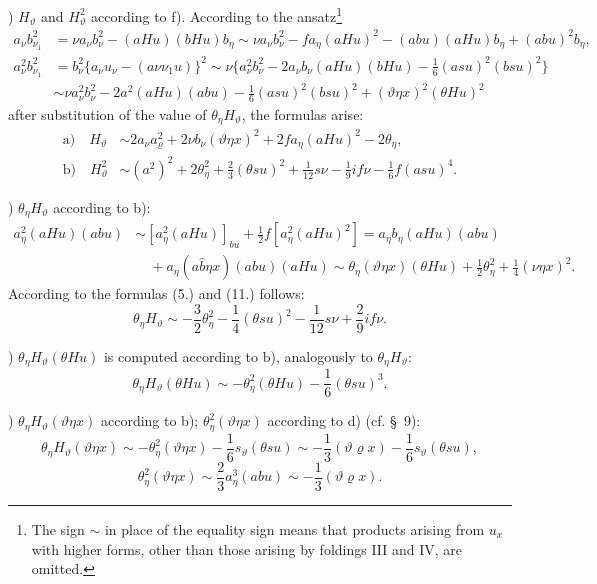 \documentclass[11pt]{article}
\newcommand{\R}{\varrho}
\begin{document}
) $H_\vartheta$ and $H_\vartheta^2$ according to f). According to the ansatz\footnote{The sign $\sim$ in place of the equality sign means that products arising from $u_x$ with higher forms, other than those arising by foldings III and IV, are omitted.}
\[
\begin{aligned}
a_\nu b_{\nu_1}^2
&=\nu a_\nu b_\nu^2-(aHu)(bHu)b_\eta
\sim \nu a_\nu b_\nu^2-f a_\eta(aHu)^2-(abu)(aHu)b_\eta+(abu)^2b_\eta,\\
a_\nu^2b_{\nu_1}^2
&=b_\nu^2\{a_\nu u_\nu-(a\nu\nu_1u)\}^2
\sim \nu\{a_\nu^2b_\nu^2-2a_\nu b_\nu(aHu)(bHu)
-\frac16(asu)^2(bsu)^2\}\\
&\sim \nu a_\nu^2b_\nu^2-2a^2(aHu)(abu)-\frac16(asu)^2(bsu)^2+(\vartheta\eta x)^2(\theta Hu)^2
\end{aligned}
\]
after substitution of the value of $\theta_\eta H_\vartheta$, the formulas arise:
\[
\tag{12}
\begin{aligned}
\text{a)}\quad H_\vartheta&\sim 2a_\nu a_\R^2+2\nu b_\nu(\vartheta\eta x)^2+2f a_\eta(aHu)^2-2\theta_\eta,\\
\text{b)}\quad H_\vartheta^2&\sim (a^2)^2+2\theta_\eta^2+\frac23(\theta su)^2
+\frac1{12}s\nu-\frac19if\nu-\frac16f(asu)^4.
\end{aligned}
\]

) $\theta_\eta H_\vartheta$ according to b):
\[
\begin{aligned}
a_\eta^2(aHu)(abu)&\sim [a_\eta^2(aHu)]_{bu}+\frac12 f[a_\eta^2(aHu)^2]
=a_\eta b_\eta(aHu)(abu)\\
&\quad+a_\eta(a\widehat{b}\eta x)(abu)(aHu)
\sim \theta_\eta(\vartheta\eta x)(\theta Hu)+\frac12\theta_\eta^2+\frac14(\nu\eta x)^2.
\end{aligned}
\]
According to the formulas (5.) and (11.) follows:
\[
\theta_\eta H_\vartheta\sim -\frac32\theta_\eta^2-\frac14(\theta su)^2-\frac1{12}s\nu+\frac29if\nu.
\]

) $\theta_\eta H_\vartheta(\theta Hu)$ is computed according to b), analogously to $\theta_\eta H_\vartheta$:
\[
\theta_\eta H_\vartheta(\theta Hu)\sim-\theta_\eta^2(\theta Hu)-\frac16(\theta su)^3.
\]

) $\theta_\eta H_\vartheta(\vartheta\eta x)$ according to b); $\theta_\eta^2(\vartheta\eta x)$ according to d) (cf. \S\ 9):
\[
\theta_\eta H_\vartheta(\vartheta\eta x)\sim-\theta_\eta^2(\vartheta\eta x)-\frac16s_\vartheta(\theta su)
\sim-\frac13(\vartheta\R x)-\frac16s_\vartheta(\theta su),
\]
\[
\theta_\eta^2(\vartheta\eta x)\sim\frac23a_\eta^3(abu)\sim-\frac13(\vartheta\R x).
\]
\end{document}
